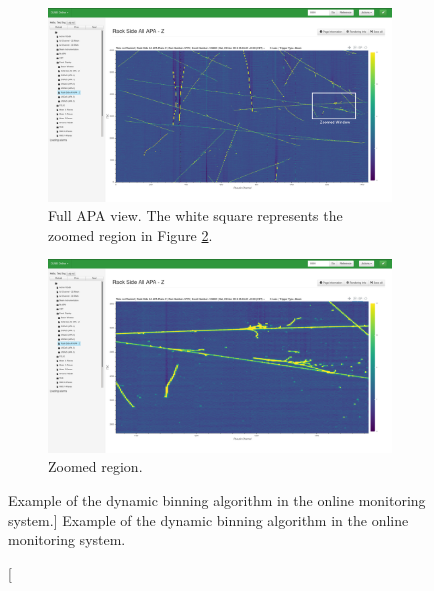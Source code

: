 \begin{figure}

	\centering

	\begin{subfigure}[b]{\textwidth}
		\centering
		\vspace{3mm}
		\includegraphics[width=\textwidth]{figures/zoomed_out.png}
		\caption {Full APA view. The white square represents the zoomed region in
		Figure \ref{fig:zoomed_in}.}
		\label{fig:zoomed_out}
	\end{subfigure}

	\begin{subfigure}[b]{\textwidth}
		\centering
		\vspace{3mm}
		\includegraphics[width=\textwidth]{figures/zoomed_in.png}
		\caption {Zoomed region.}
		\label{fig:zoomed_in}
	\end{subfigure}

	\caption
	[Example of the dynamic binning algorithm in the \protodune{} online
	monitoring system.]
	{ Example of the dynamic binning algorithm in the \protodune{} online
	monitoring system. }
	\label{fig:dynamic_binning}

\end{figure}

